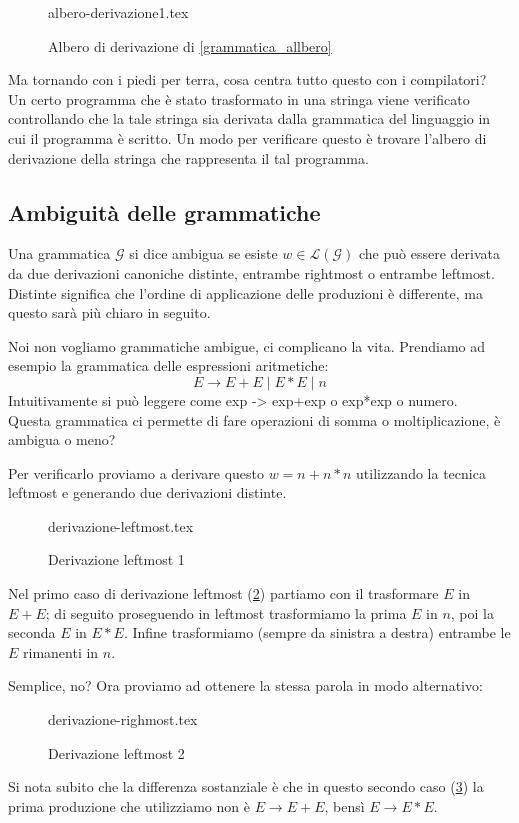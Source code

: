 \documentclass[class=book, crop=false, oneside, 12pt]{standalone}
\begin{document}
\begin{figure}[H]
	\centering
    {albero-derivazione1.tex}
    \caption{Albero di derivazione di \ref{grammatica_allbero}}
    \label{albero_di_derivazione}
\end{figure}
Ma tornando con i piedi per terra, cosa centra tutto questo con i compilatori?\\
Un certo programma che è stato trasformato in una stringa viene verificato controllando che la tale stringa sia derivata dalla grammatica del linguaggio in cui il programma è scritto. Un modo per verificare questo è trovare l’albero di derivazione della stringa che rappresenta il tal programma.

\subsection{Ambiguità delle grammatiche}
Una grammatica \(\mathcal{G}\) si dice ambigua se esiste \(w \in \mathcal{L}(\mathcal{G})\) che può essere derivata da due derivazioni canoniche distinte, entrambe rightmost o entrambe leftmost. Distinte significa che l'ordine di applicazione delle produzioni è differente, ma questo sarà più chiaro in seguito.

Noi non vogliamo grammatiche ambigue, ci complicano la vita.
Prendiamo ad esempio la grammatica delle espressioni aritmetiche:
\begin{equation}
    E \to E+E \mid E*E \mid  n
\end{equation}
Intuitivamente si può leggere come exp -> exp+exp  o  exp*exp  o  numero.\\
Questa grammatica ci permette di fare operazioni di somma o moltiplicazione, è ambigua o meno?

Per verificarlo proviamo a derivare questo \(w = n+n*n\) utilizzando la tecnica leftmost e generando due derivazioni distinte.

\begin{figure}[H]
	\centering
	{derivazione-leftmost.tex}
    \caption{Derivazione leftmost 1}
    \label{leftmost_1}
\end{figure}
Nel primo caso di derivazione leftmost (\ref{leftmost_1}) partiamo con il trasformare \(E\) in \(E+E\); di seguito proseguendo in leftmost trasformiamo la prima \(E\) in \(n\), poi la seconda \(E\) in \(E*E\).
Infine trasformiamo (sempre da sinistra a destra) entrambe le \(E\) rimanenti in \(n\).

Semplice, no? Ora proviamo ad ottenere la stessa parola in modo alternativo:
\begin{figure}[H]
	\centering
	{derivazione-righmost.tex}
    \caption{Derivazione leftmost 2}
    \label{leftmost_2}
\end{figure}
Si nota subito che la differenza sostanziale è che in questo secondo caso (\ref{leftmost_2}) la prima produzione che utilizziamo non è \(E \to E+E\), bensì \(E \to E*E\).
\end{document}
